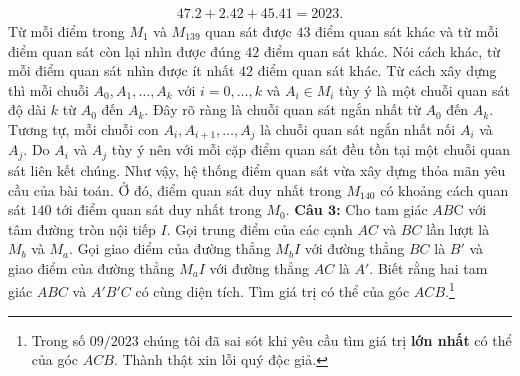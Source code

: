\begin{multicols}{2}
\begin{align*}
			47.2 + 2.42 + 45.41 = 2023.
		\end{align*}
		Từ mỗi điểm trong $M_1$ và $M_{139}$ quan sát được $43$ điểm quan sát khác và từ mỗi điểm quan sát còn lại nhìn được đúng $42$ điểm quan sát khác. Nói cách khác, từ mỗi điểm quan sát nhìn được ít nhất $42$ điểm quan sát khác. Từ cách xây dựng thì mỗi chuỗi $A_0, A_1, \ldots, A_k$ với $i = 0, \ldots, k$ và $A_i \in M_i$ tùy ý là một chuỗi quan sát độ dài $k$ từ $A_0$ đến $A_k$. Đây rõ ràng là chuỗi quan sát ngắn nhất từ $A_0$ đến $A_k$. Tương tự, mỗi chuỗi con $A_i, A_{i+1}, \ldots, A_j$ là chuỗi quan sát ngắn nhất nối $A_i$ và $A_j$. Do $A_i$ và $A_j$ tùy ý nên với mỗi cặp điểm quan sát đều tồn tại một chuỗi quan sát liên kết chúng. Như vậy, hệ thống điểm quan sát vừa xây dựng thỏa mãn yêu cầu của bài toán. Ở đó, điểm quan sát duy nhất trong $M_{140}$ có khoảng cách quan sát $140$ tới điểm quan sát duy nhất trong $M_0$.
		\vskip 0.1cm
	\textbf{Câu $\pmb{3}$:} Cho tam giác $AB$C với tâm đường tròn nội tiếp $I$. Gọi trung điểm của các cạnh $AC$ và $BC$ lần lượt là $M_b$ và $M_a$. Gọi giao điểm của đường thẳng $M_bI$ với đường thẳng $BC$ là $B'$ và giao điểm của đường thẳng $M_aI$ với đường thẳng $AC$ là $A'$. Biết rằng hai tam giác $ABC$ và $A'B'C$ có cùng diện tích. 
	\vskip 0.1cm
	Tìm giá trị có thể của góc $ACB$.\footnote{Trong số $09/2023$ chúng tôi đã sai sót khi yêu cầu tìm giá trị \textbf{lớn nhất} có thể của góc $ACB$. Thành thật xin lỗi quý độc giả.}	
		\begin{figure}[H]
			\vspace*{-5pt}
			\centering
			\captionsetup{labelformat= empty, justification=centering}
\end{figure}
\end{multicols}
